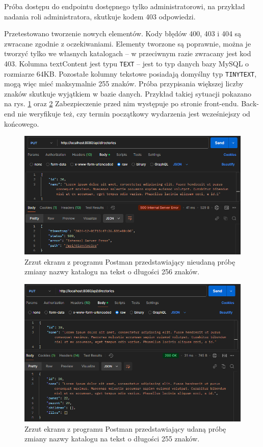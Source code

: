 \documentclass[a4paper,twoside,12pt]{book}
\begin{document}
Próba dostępu do endpointu dostępnego tylko administratorowi, na przykład nadania roli administratora, skutkuje kodem 403 odpowiedzi.

Przetestowano tworzenie nowych elementów. Kody błędów 400, 403 i 404 są zwracane zgodnie z oczekiwaniami. Elementy tworzone są poprawnie, można je tworzyć tylko we własnych katalogach -- w przeciwnym razie zwracany jest kod 403. Kolumna textContent jest typu \texttt{TEXT} -- jest to typ danych bazy MySQL o rozmiarze 64KB. Pozostałe kolumny tekstowe posiadają domyślny typ \texttt{TINYTEXT}, mogą więc mieć maksymalnie 255 znaków. Próba przypisania większej liczby znaków skutkuje wyjątkiem w bazie danych. Przykład takiej sytuacji pokazano na rys. \ref{fig:change-name-256} oraz \ref{fig:change-name-255} Zabezpieczenie przed nim występuje po stronie front-endu. Back-end nie weryfikuje też, czy termin początkowy wydarzenia jest wcześniejszy od końcowego.

\begin{figure}
\centering
\includegraphics[width=\textwidth]{./ChangeName256.png}
\caption{Zrzut ekranu z programu Postman przedstawiający nieudaną próbę zmiany nazwy katalogu na tekst o długości 256 znaków.}
\label{fig:change-name-256}
\end{figure}

\begin{figure}
\centering
\includegraphics[width=\textwidth]{./ChangeName255.png}
\caption{Zrzut ekranu z programu Postman przedstawiający udaną próbę zmiany nazwy katalogu na tekst o długości 255 znaków.}
\label{fig:change-name-255}
\end{figure}
\end{document}
